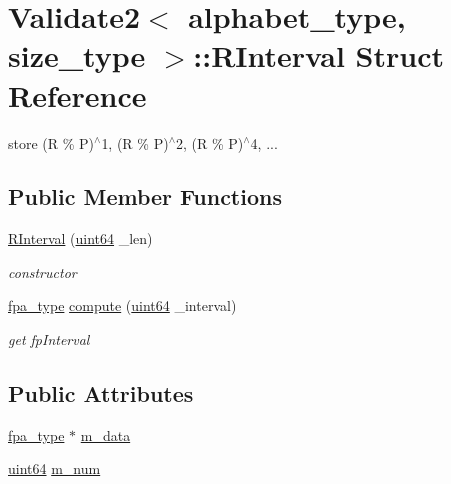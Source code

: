 \hypertarget{struct_validate2_1_1_r_interval}{}\section{Validate2$<$ alphabet\+\_\+type, size\+\_\+type $>$\+:\+:R\+Interval Struct Reference}
\label{struct_validate2_1_1_r_interval}


store (R \% P)$^\wedge$1, (R \% P)$^\wedge$2, (R \% P)$^\wedge$4, ...  


\subsection*{Public Member Functions}
\begin{DoxyCompactItemize}
\item 
\hyperlink{struct_validate2_1_1_r_interval_af2e88047192f7e9703b9faa2298cb5fc}{R\+Interval} (\hyperlink{types_8h_a60e8696a4678cd348e991a1f172e53f7}{uint64} \+\_\+len)
\begin{DoxyCompactList}\small\item\em constructor \end{DoxyCompactList}\item 
\hyperlink{common_8h_a7fdaf8b9b3d2f6ae6b10597a8d3f96ee}{fpa\+\_\+type} \hyperlink{struct_validate2_1_1_r_interval_a84006809e4b3ef58bd7335d2f46a92b1}{compute} (\hyperlink{types_8h_a60e8696a4678cd348e991a1f172e53f7}{uint64} \+\_\+interval)
\begin{DoxyCompactList}\small\item\em get fp\+Interval \end{DoxyCompactList}\end{DoxyCompactItemize}
\subsection*{Public Attributes}
\begin{DoxyCompactItemize}
\item 
\hyperlink{common_8h_a7fdaf8b9b3d2f6ae6b10597a8d3f96ee}{fpa\+\_\+type} $\ast$ \hyperlink{struct_validate2_1_1_r_interval_aee05aa76b959338fd2d1c0833f2e35d7}{m\+\_\+data}
\item 
\hyperlink{types_8h_a60e8696a4678cd348e991a1f172e53f7}{uint64} \hyperlink{struct_validate2_1_1_r_interval_ace46ef0a61dad6c184579e23bfae12ce}{m\+\_\+num}
\end{DoxyCompactItemize}


